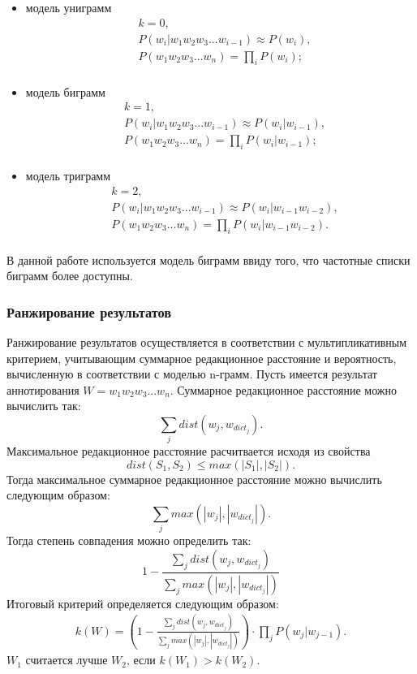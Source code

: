 \begin{itemize}
	\item
	модель униграмм
	\begin{align*}
		&k = 0,\\
		&P(w_i|w_1w_2w_3...w_{i-1}) \approx P(w_i), \\
		&P(w_1w_2w_3...w_n) = \prod_{i}P(w_i); \\
	\end{align*}
	\item
	модель биграмм
	\begin{align*}
		&k = 1, \\
		&P(w_i|w_1w_2w_3...w_{i-1}) \approx P(w_i|w_{i-1}), \\
		&P(w_1w_2w_3...w_n) = \prod_{i}P(w_i|w_{i-1}); \\
	\end{align*}
	\item
	модель триграмм
	\begin{align*}
		&k = 2, \\
		&P(w_i|w_1w_2w_3...w_{i-1}) \approx P(w_i|w_{i-1}w_{i-2}), \\
		&P(w_1w_2w_3...w_n) = \prod_{i}P(w_i|w_{i-1}w_{i-2}). \\
	\end{align*}
\end{itemize}
В данной работе используется модель биграмм ввиду того, что частотные списки биграмм более доступны.
\subsubsection{Ранжирование результатов}
Ранжирование результатов осуществляется в соответствии с мультипликативным критерием, учитывающим суммарное редакционное расстояние и вероятность, вычисленную в соответствии с моделью n-грамм. Пусть имеется результат аннотирования \(W = w_1w_2w_3...w_n\). Суммарное редакционное расстояние можно вычислить так:
\[\displaystyle\sum_{j} dist(w_j,w_{dict_j}) .\]
Максимальное редакционное расстояние расчитвается исходя из свойства
\[dist(S_1, S_2) \leq max(|S_1|, |S_2|).\]
Тогда максимальное суммарное редакционное расстояние можно вычислить следующим образом:
\[\displaystyle\sum_{j} max(|w_j|,|w_{dict_j}|) .\]
Тогда степень совпадения можно определить так:
\[1 - \frac{\displaystyle\sum_{j} dist(w_j,w_{dict_j}) }{\displaystyle\sum_{j} max(|w_j|,|w_{dict_j}|) }\]
Итоговый критерий определяется следующим образом:
\begin{align*}
	k(W) = \left(1 - \frac{\displaystyle\sum_{j} dist(w_j,w_{dict_j}) }{\displaystyle\sum_{j} max(|w_j|,|w_{dict_j}|) }\right) \cdot \prod_{j}P(w_j|w_{j-1}).
\end{align*}
\(W_1\) считается лучше \(W_2\), если \(k(W_1) > k(W_2)\).
